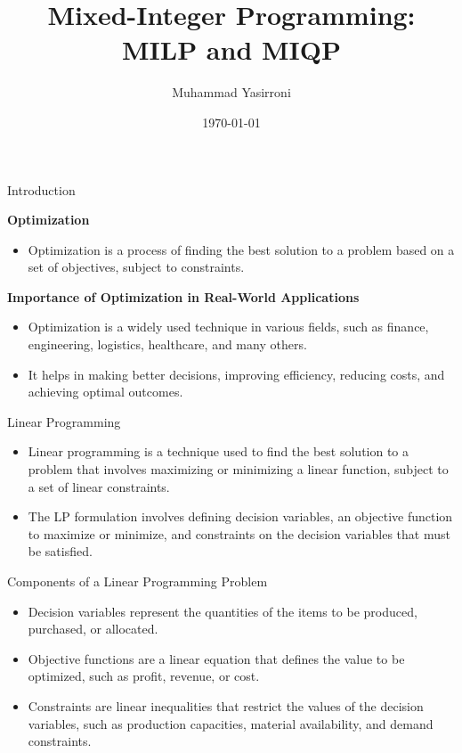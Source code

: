 \documentclass{beamer}
\title{Mixed-Integer Programming: MILP and MIQP}
\author{Muhammad Yasirroni}
\institute{Universitas Gadjah Mada}
\date{\today}
\begin{document}
\frame{\titlepage}

\begin{frame}{Introduction}

    \textbf{Optimization}

    \begin{itemize}
        \item Optimization is a process of finding the best solution to a problem based on a set of objectives, subject to constraints.
    \end{itemize}

    \textbf{Importance of Optimization in Real-World Applications}

    \begin{itemize}
        \item Optimization is a widely used technique in various fields, such as finance, engineering, logistics, healthcare, and many others.
        \item It helps in making better decisions, improving efficiency, reducing costs, and achieving optimal outcomes.
    \end{itemize}

\end{frame}

\begin{frame}{Linear Programming}
    \begin{itemize}
        \item Linear programming is a technique used to find the best solution to a problem that involves maximizing or minimizing a linear function, subject to a set of linear constraints.
        \item The LP formulation involves defining decision variables, an objective function to maximize or minimize, and constraints on the decision variables that must be satisfied.
    \end{itemize}
\end{frame}

\begin{frame}{Components of a Linear Programming Problem}
    \begin{itemize}
        \item Decision variables represent the quantities of the items to be produced, purchased, or allocated.
        \item Objective functions are a linear equation that defines the value to be optimized, such as profit, revenue, or cost.
        \item Constraints are linear inequalities that restrict the values of the decision variables, such as production capacities, material availability, and demand constraints.
    \end{itemize}
\end{frame}
\end{document}
